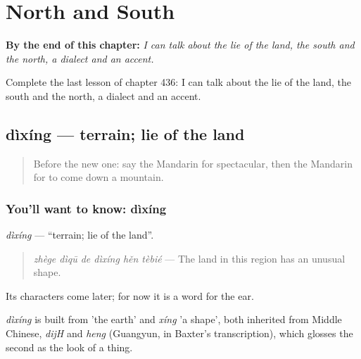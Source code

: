 
\chapter{North and South}
\label{ch:zh-north-and-south}

\begin{chapteropening}
\textbf{By the end of this chapter:} \emph{I can talk about the lie of the land, the south and the north, a dialect and an accent.}

Complete the last lesson of chapter 436: I can talk about the lie of the land, the south and the north, a dialect and an accent.
\end{chapteropening}

\section[dìxíng]{dìxíng — terrain; lie of the land}

\label{lesson:ZH-C436-dixing}



\begin{quote}
Before the new one: say the Mandarin for spectacular, then the Mandarin for to come down a mountain.
\end{quote}

\subsection*{You'll want to know: dìxíng}
\emph{dìxíng} — \textquotedblleft{}terrain; lie of the land\textquotedblright{}.

\begin{quote}
\emph{zhège dìqū de dìxíng hěn tèbié} — The land in this region has an unusual shape.
\end{quote}

Its characters come later; for now it is a word for the ear.

\begin{cousinweb}
\emph{dìxíng} is built from  'the earth' and \emph{xíng} 'a shape', both inherited from Middle Chinese, \emph{dijH} and \emph{heng} (Guangyun, in Baxter's transcription), which glosses the second as the look of a thing.
\end{cousinweb}

